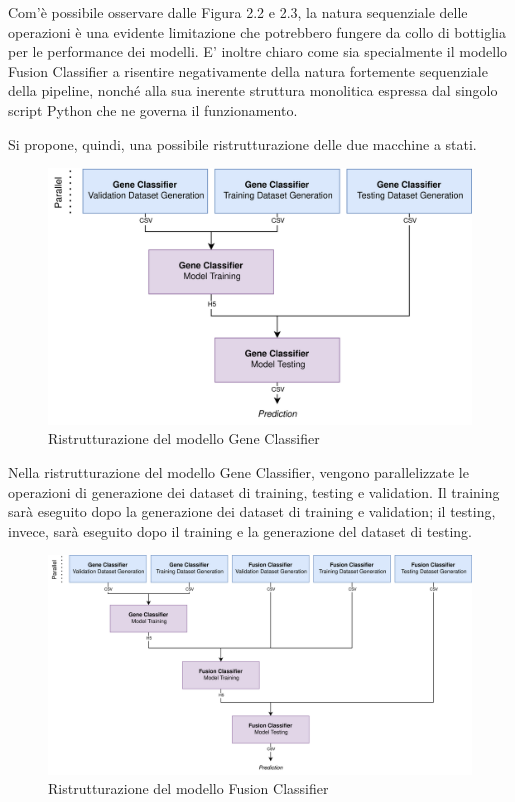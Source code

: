 Com'è possibile osservare dalle Figura 2.2 e 2.3, la natura sequenziale delle operazioni è una evidente limitazione che potrebbero fungere da collo di bottiglia per le performance dei modelli. E' inoltre chiaro come sia specialmente il modello Fusion Classifier a risentire negativamente della natura fortemente sequenziale della pipeline, nonché alla sua inerente struttura monolitica espressa dal singolo script Python che ne governa il funzionamento.

Si propone, quindi, una possibile ristrutturazione delle due macchine a stati.

\begin{figure}[h]
    \centering
    \includegraphics[width=\linewidth]{figures/ch2/new_gene.png}
    \caption[Ristrutturazione del modello Gene Classifier]{Ristrutturazione del modello Gene Classifier}
    \label{fig:cha2:new_gene_stati}
\end{figure}

Nella ristrutturazione del modello Gene Classifier, vengono parallelizzate le operazioni di generazione dei dataset di training, testing e validation. Il training sarà eseguito dopo la generazione dei dataset di training e validation; il testing, invece, sarà eseguito dopo il training e la generazione del dataset di testing.

\begin{figure}[h]
    \centering
    \includegraphics[width=\linewidth]{figures/ch2/new_fusion.png}
    \caption[Ristrutturazione del modello Fusion Classifier]{Ristrutturazione del modello Fusion Classifier}
    \label{fig:cha2:new_fusion_stati}
\end{figure}


